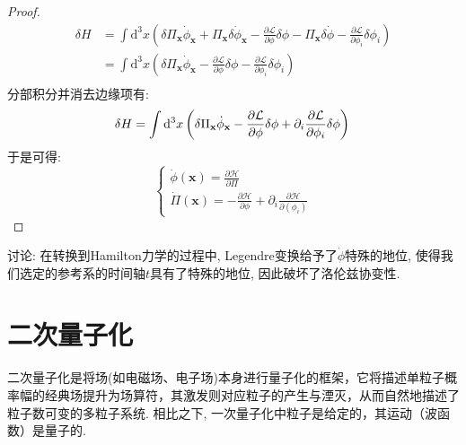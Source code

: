 \begin{proof}
    \begin{equation}
        \begin{split}
            \delta H &= \int \mathrm d^3x \left(\delta\Pi_\mathbf x\dot\phi_\mathbf x+\Pi_\mathbf x\delta\dot\phi_\mathbf x-\frac{\partial\mathcal L}{\partial\phi}\delta\phi-\Pi_\mathbf x\delta\dot\phi-\frac{\partial\mathcal L}{\partial\phi_i}\delta\phi_i\right)\\
            &= \int \mathrm d^3x \left(\delta\Pi_\mathbf x\dot\phi_\mathbf x - \frac{\partial\mathcal L}{\partial\phi}\delta\phi - \frac{\partial\mathcal L}{\partial\phi_i}\delta\phi_i\right)\\
        \end{split}
    \end{equation}
    分部积分并消去边缘项有:
    \begin{equation}
        \delta H= \int \mathrm d^3x \left(\delta\Pi_\mathbf x\dot\phi_\mathbf x - \frac{\partial\mathcal L}{\partial\phi}\delta\phi + \partial_i\frac{\partial\mathcal L}{\partial\phi_i}\delta\phi\right)\\
    \end{equation}
    于是可得:
    \begin{equation}
        \begin{cases}
            \dot\phi(\mathbf x) = \frac{\partial\mathcal H}{\partial\Pi}\\
            \dot\Pi(\mathbf x) = -\frac{\partial\mathcal H}{\partial\phi}+\partial_i\frac{\partial\mathcal H}{\partial(\phi_i)}
        \end{cases}
    \end{equation}
\end{proof}
讨论: 在转换到Hamilton力学的过程中, Legendre变换给予了$\dot\phi$特殊的地位, 使得我们选定的参考系的时间轴$t$具有了特殊的地位, 因此破坏了洛伦兹协变性.

\newpage
\section{二次量子化}
\songti 二次量子化是将场(如电磁场、电子场)本身进行量子化的框架，它将描述单粒子概率幅的经典场提升为场算符，其激发则对应粒子的产生与湮灭，从而自然地描述了粒子数可变的多粒子系统. 相比之下, 一次量子化中粒子是给定的，其运动（波函数）是量子的.
